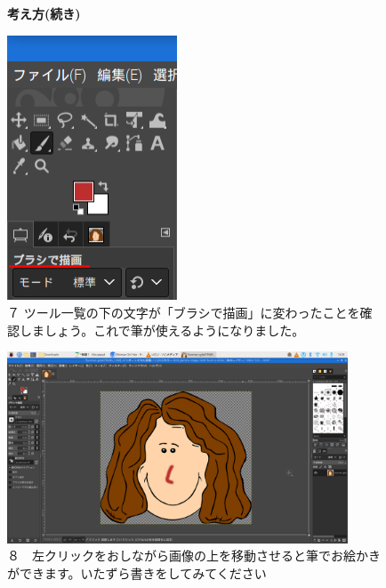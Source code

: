\documentclass[a4paper,12pt]{jarticle}
\begin{document}
\begin{figure}[ht]
  \textbf{考え方(続き)}

  \begin{minipage}{\textwidth}
    \centering
    \begin{minipage}{5.76cm}
      \includegraphics[width=5.05cm]{textbook-img130.png}\\
      ７
      ツール一覧の下の文字が「ブラシで描画」に変わったことを確認しましょう。これで筆が使えるようになりました。
    \end{minipage}
    \hfill
    \begin{minipage}{10.2cm}
      \includegraphics[width=10.134cm]{textbook-img131.png}\\
      ８　左クリックをおしながら画像の上を移動させると筆でお絵かきができます。いたずら書きをしてみてください
    \end{minipage}
  \end{minipage}


  \bigskip


\end{figure}
\end{document}
